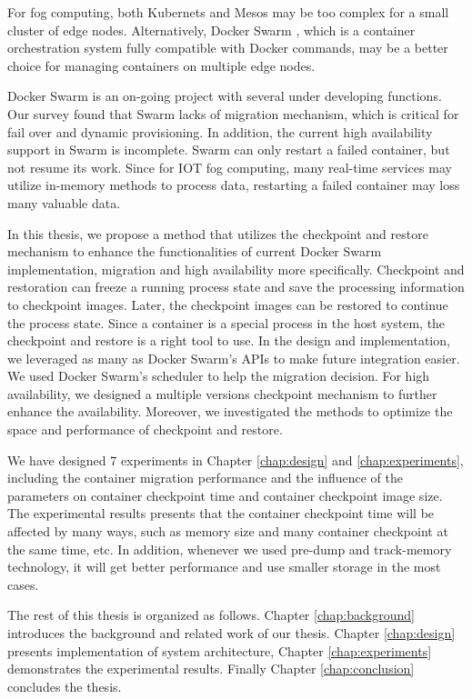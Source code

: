 For fog computing, both Kubernets and Mesos may be too complex for a small cluster of edge nodes.  Alternatively, Docker Swarm \cite{DockerSwarm}, which is a container orchestration system fully compatible with Docker commands, may be a better choice for managing containers on multiple edge nodes.

Docker Swarm is an on-going project with several under developing functions.  Our survey found that Swarm lacks of migration mechanism, which is critical for fail over and dynamic provisioning.  In addition, the current high availability support in Swarm is incomplete.  Swarm can only restart a failed container, but not resume its work.  Since for IOT fog computing, many real-time services may utilize in-memory methods to process data, restarting a failed container may loss many valuable data.

In this thesis, we propose a method that utilizes the checkpoint and restore mechanism to enhance the functionalities of current Docker Swarm implementation, migration and high availability more specifically.  Checkpoint and restoration \cite{Bhattiprolu:2008:VSC:1400097.1400109} can freeze a running process state and save the processing information to checkpoint images. Later, the checkpoint images can be restored to continue the process state.  Since a container is a special process in the host system, the checkpoint and restore is a right tool to use. In the design and implementation, we leveraged as many as Docker Swarm's APIs to make future integration easier.  We used Docker Swarm's scheduler to help the migration decision.  For high availability, we designed a multiple versions checkpoint mechanism to further enhance the availability.  Moreover, we investigated the methods to optimize the space and performance of checkpoint and restore.

We have designed 7 experiments in Chapter \ref{chap:design} and \ref{chap:experiments}, including the container migration performance and the influence of the parameters on container checkpoint time and container checkpoint image size.  The experimental results presents that the container checkpoint time will be affected by many ways, such as memory size and many container checkpoint at the same time, etc.  In addition, whenever we used pre-dump and track-memory technology, it will get better performance and use smaller storage in the most cases.

The rest of this thesis is organized as follows.  Chapter \ref{chap:background} introduces the background and related work of our thesis.  Chapter \ref{chap:design} presents implementation of system architecture,  Chapter \ref{chap:experiments} demonstrates the experimental results.  Finally Chapter \ref{chap:conclusion} concludes the thesis.